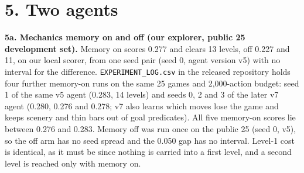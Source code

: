 \documentclass[
  11pt,
]{article}
\begin{document}
\section{5. Two agents}\label{two-agents}

\textbf{5a. Mechanics memory on and off (our explorer, public 25
development set).} Memory on scores 0.277 and clears 13 levels, off
0.227 and 11, on our local scorer, from one seed pair (seed 0, agent
version v5) with no interval for the difference.
\texttt{EXPERIMENT\_LOG.csv} in the released repository holds four
further memory-on runs on the same 25 games and 2,000-action budget:
seed 1 of the same v5 agent (0.283, 14 levels) and seeds 0, 2 and 3 of
the later v7 agent (0.280, 0.276 and 0.278; v7 also learns which moves
lose the game and keeps scenery and thin bars out of goal predicates).
All five memory-on scores lie between 0.276 and 0.283. Memory off was
run once on the public 25 (seed 0, v5), so the off arm has no seed
spread and the 0.050 gap has no interval. Level-1 cost is identical, as
it must be since nothing is carried into a first level, and a second
level is reached only with memory on.
\end{document}
